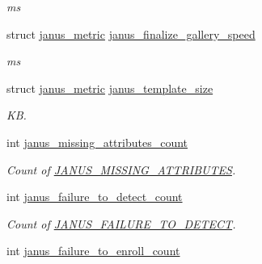 \begin{DoxyCompactItemize}
\begin{DoxyCompactList}\small\item\em ms \end{DoxyCompactList}\item 
\hypertarget{structjanus__metrics_a2df6761b2c89a2b8e80fd29a79239f28}{}struct \hyperlink{structjanus__metric}{janus\+\_\+metric} \hyperlink{structjanus__metrics_a2df6761b2c89a2b8e80fd29a79239f28}{janus\+\_\+finalize\+\_\+gallery\+\_\+speed}\label{structjanus__metrics_a2df6761b2c89a2b8e80fd29a79239f28}

\begin{DoxyCompactList}\small\item\em ms \end{DoxyCompactList}\item 
\hypertarget{structjanus__metrics_ac24b03aee6cc1745ad46a2603cc40527}{}struct \hyperlink{structjanus__metric}{janus\+\_\+metric} \hyperlink{structjanus__metrics_ac24b03aee6cc1745ad46a2603cc40527}{janus\+\_\+template\+\_\+size}\label{structjanus__metrics_ac24b03aee6cc1745ad46a2603cc40527}

\begin{DoxyCompactList}\small\item\em K\+B. \end{DoxyCompactList}\item 
\hypertarget{structjanus__metrics_a99b852d5d6f53bdbad86d8bbe71ae817}{}int \hyperlink{structjanus__metrics_a99b852d5d6f53bdbad86d8bbe71ae817}{janus\+\_\+missing\+\_\+attributes\+\_\+count}\label{structjanus__metrics_a99b852d5d6f53bdbad86d8bbe71ae817}

\begin{DoxyCompactList}\small\item\em Count of \hyperlink{group__janus_gga1b275e4dade484951b366f785597b8f6aa4c0854ce7d2d0c12ec33af8a37a55fd}{J\+A\+N\+U\+S\+\_\+\+M\+I\+S\+S\+I\+N\+G\+\_\+\+A\+T\+T\+R\+I\+B\+U\+T\+E\+S}. \end{DoxyCompactList}\item 
\hypertarget{structjanus__metrics_a45a05c2dfdea4ed6e0e3f0de46d3ccb8}{}int \hyperlink{structjanus__metrics_a45a05c2dfdea4ed6e0e3f0de46d3ccb8}{janus\+\_\+failure\+\_\+to\+\_\+detect\+\_\+count}\label{structjanus__metrics_a45a05c2dfdea4ed6e0e3f0de46d3ccb8}

\begin{DoxyCompactList}\small\item\em Count of \hyperlink{group__janus_gga1b275e4dade484951b366f785597b8f6a4243e7aae5114b32c01325bc5952d7b6}{J\+A\+N\+U\+S\+\_\+\+F\+A\+I\+L\+U\+R\+E\+\_\+\+T\+O\+\_\+\+D\+E\+T\+E\+C\+T}. \end{DoxyCompactList}\item 
\hypertarget{structjanus__metrics_a68f2c46151eae37ac2fe8471e2f6d9c9}{}int \hyperlink{structjanus__metrics_a68f2c46151eae37ac2fe8471e2f6d9c9}{janus\+\_\+failure\+\_\+to\+\_\+enroll\+\_\+count}\label{structjanus__metrics_a68f2c46151eae37ac2fe8471e2f6d9c9}


\end{DoxyCompactItemize}
